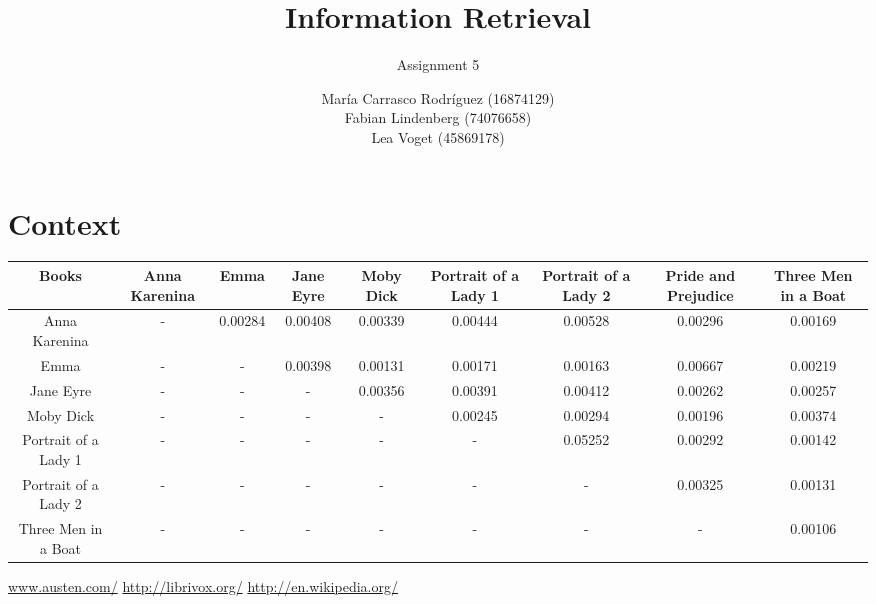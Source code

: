 \documentclass[a4paper,11pt,oneside]{book}
\title{Information Retrieval }
\subtitle{Assignment 5}
\author{ María Carrasco Rodríguez (16874129) \\
		Fabian Lindenberg (74076658)\\
		Lea Voget (45869178)}
\begin{document}
\kostspieligmaketitle


\chapter{Context}


 \begin{tabular} {|c|c|c|c|c|c|c|c|c| }
   Books & Anna Karenina & Emma & Jane Eyre &  Moby Dick & Portrait of a Lady 1 & Portrait of a Lady 2 & Pride and Prejudice  &  Three Men in a Boat \\ \hline
 Anna Karenina & - & 0.00284 &  0.00408 &  0.00339 & 0.00444 &  0.00528 & 0.00296 &  0.00169  \\ \hline
 Emma & - & - & 0.00398 & 0.00131 & 0.00171& 0.00163 & 0.00667 &  0.00219\\ \hline
 Jane Eyre & - & - & - & 0.00356 &  0.00391 & 0.00412 & 0.00262 & 0.00257\\ \hline
Moby Dick & - & - & - & - & 0.00245 &  0.00294 & 0.00196 & 0.00374\\ \hline
Portrait of a Lady 1 & - & - & - & - & - & 0.05252 & 0.00292 & 0.00142 \\ \hline
Portrait of a Lady 2 & - & - & - & - & - & - & 0.00325 & 0.00131 \\ \hline
Three Men in a Boat & - & - & - & - & - & - & - & 0.00106 \\ 
    \hline
\end{tabular}


\pagebreak
\begin{thebibliography}{XXX}
	 \url{www.austen.com/}
	 \url{http://librivox.org/}
	 \url{http://en.wikipedia.org/}
	 \url{}
	 \url{}
	 \url{}
	 \url{}
	 \url{}
	 \url{}
\end{thebibliography}
\end{document}
